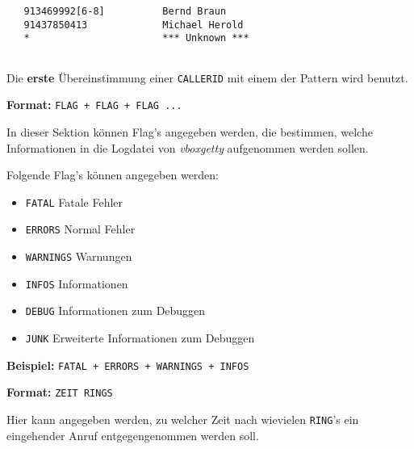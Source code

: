 \begin{description}
\begin{verbatim}
   913469992[6-8]          Bernd Braun
   91437850413             Michael Herold
   *                       *** Unknown ***
   
\end{verbatim}


Die {\bf erste} \"{U}bereinstimmung einer {\tt CALLERID} mit einem der
Pattern wird benutzt.



\item[{\tt [DEBUG]}] \mbox{}



{\bf Format:} {\tt FLAG + FLAG + FLAG ...}

In dieser Sektion k\"{o}nnen Flag's angegeben werden, die bestimmen, welche
Informationen in die Logdatei von {\em vboxgetty\/} aufgenommen werden
sollen.

Folgende Flag's k\"{o}nnen angegeben werden:

\begin{itemize}
\item {\tt FATAL}
Fatale Fehler



\item {\tt ERRORS}
Normal Fehler



\item {\tt WARNINGS}
Warnungen



\item {\tt INFOS}
Informationen



\item {\tt DEBUG}
Informationen zum Debuggen



\item {\tt JUNK}
Erweiterte Informationen zum Debuggen



\end{itemize}


{\bf Beispiel:} {\tt FATAL + ERRORS + WARNINGS + INFOS}



\item[{\tt [RINGS]}] \mbox{}



{\bf Format:} {\tt ZEIT RINGS}

Hier kann angegeben werden, zu welcher Zeit nach wievielen {\tt RING}'s
ein eingehender Anruf entgegengenommen werden soll.


\end{description}
